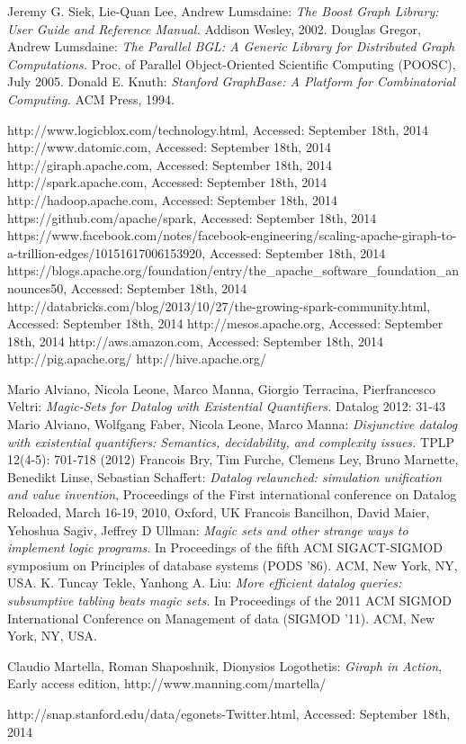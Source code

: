 \begin{thebibliography}{99}
 Jeremy G. Siek, Lie-Quan Lee, Andrew Lumsdaine: \textit{The Boost Graph Library: User Guide and Reference Manual.} Addison Wesley, 2002.
 Douglas Gregor, Andrew Lumsdaine: \textit{The Parallel BGL: A Generic Library for Distributed Graph Computations.} Proc. of Parallel Object-Oriented Scientific Computing (POOSC), July 2005.
 Donald E. Knuth: \textit{Stanford GraphBase: A Platform for Combinatorial Computing.} ACM Press, 1994.

 http://www.logicblox.com/technology.html, Accessed: September 18th, 2014
 http://www.datomic.com, Accessed: September 18th, 2014
 http://giraph.apache.com, Accessed: September 18th, 2014
 http://spark.apache.com, Accessed: September 18th, 2014
 http://hadoop.apache.com, Accessed: September 18th, 2014
 https://github.com/apache/spark, Accessed: September 18th, 2014
 https://www.facebook.com/notes/facebook-engineering/scaling-apache-giraph-to-a-trillion-edges/10151617006153920, Accessed: September 18th, 2014
 https://blogs.apache.org/foundation/entry/the\_apache\_software\_foundation\_announces50, Accessed: September 18th, 2014
 http://databricks.com/blog/2013/10/27/the-growing-spark-community.html, Accessed: September 18th, 2014
 http://mesos.apache.org, Accessed: September 18th, 2014
 http://aws.amazon.com, Accessed: September 18th, 2014
 http://pig.apache.org/
 http://hive.apache.org/

 Mario Alviano, Nicola Leone, Marco Manna, Giorgio Terracina, Pierfrancesco Veltri: \textit{Magic-Sets for Datalog with Existential Quantifiers.} Datalog 2012: 31-43
 Mario Alviano, Wolfgang Faber, Nicola Leone, Marco Manna: \textit{Disjunctive datalog with existential quantifiers: Semantics, decidability, and complexity issues.} TPLP 12(4-5): 701-718 (2012)
 Francois Bry, Tim Furche, Clemens Ley, Bruno Marnette, Benedikt Linse, Sebastian Schaffert: \textit{Datalog relaunched: simulation unification and value invention}, Proceedings of the First international conference on Datalog Reloaded, March 16-19, 2010, Oxford, UK
 Francois Bancilhon, David Maier, Yehoshua Sagiv, Jeffrey D Ullman: \textit{Magic sets and other strange ways to implement logic programs}. In Proceedings of the fifth ACM SIGACT-SIGMOD symposium on Principles of database systems (PODS '86). ACM, New York, NY, USA.
 K. Tuncay Tekle, Yanhong A. Liu: \textit{More efficient datalog queries: subsumptive tabling beats magic sets.} In Proceedings of the 2011 ACM SIGMOD International Conference on Management of data (SIGMOD '11). ACM, New York, NY, USA.

 Claudio Martella, Roman Shaposhnik, Dionysios Logothetis: \textit{Giraph in Action}, Early access edition, http://www.manning.com/martella/

 http://snap.stanford.edu/data/egonets-Twitter.html, Accessed: September 18th, 2014 

\end{thebibliography}

